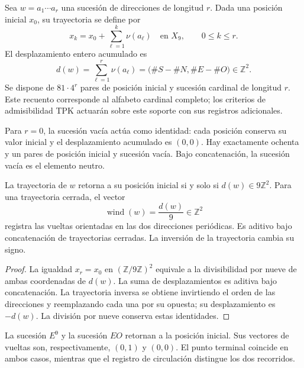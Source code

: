 Sea $w=a_1\cdots a_r$ una sucesión de direcciones de longitud $r$. Dada una posición inicial $x_0$, su trayectoria se define por
\[
 x_k=x_0+\sum_{\ell=1}^{k}\nu(a_\ell)\quad\text{en }X_9,
 \qquad 0\leq k\leq r.
\]
El desplazamiento entero acumulado es
\begin{equation}
 d(w)=\sum_{\ell=1}^{r}\nu(a_\ell)
      =\bigl(\#S-\#N,\#E-\#O\bigr)\in\mathbb Z^2.
 \label{eq:app-displacement}
\end{equation}
Se dispone de $81\cdot4^r$ pares de posición inicial y sucesión cardinal de longitud $r$. Este recuento corresponde al alfabeto cardinal completo; los criterios de admisibilidad TPK actuarán sobre este soporte con sus registros adicionales.

Para $r=0$, la sucesión vacía actúa como identidad: cada posición conserva su valor inicial y el desplazamiento acumulado es $(0,0)$. Hay exactamente ochenta y un pares de posición inicial y sucesión vacía. Bajo concatenación, la sucesión vacía es el elemento neutro.

\begin{bloqueindivisible}
\begin{teorema}
\label{thm:app-transporte}
La trayectoria de $w$ retorna a su posición inicial si y solo si $d(w)\in9\mathbb Z^2$. Para una trayectoria cerrada, el vector
\begin{equation}
 \operatorname{wind}(w)=\frac{d(w)}9\in\mathbb Z^2
\end{equation}
registra las vueltas orientadas en las dos direcciones periódicas. Es aditivo bajo concatenación de trayectorias cerradas. La inversión de la trayectoria cambia su signo.
\end{teorema}

\begin{proof}
La igualdad $x_r=x_0$ en $(\mathbb Z/9\mathbb Z)^2$ equivale a la divisibilidad por nueve de ambas coordenadas de $d(w)$. La suma de desplazamientos es aditiva bajo concatenación. La trayectoria inversa se obtiene invirtiendo el orden de las direcciones y reemplazando cada una por su opuesta; su desplazamiento es $-d(w)$. La división por nueve conserva estas identidades.
\end{proof}
\end{bloqueindivisible}

\begin{ejemplo}
La sucesión $E^9$ y la sucesión $EO$ retornan a la posición inicial. Sus vectores de vueltas son, respectivamente, $(0,1)$ y $(0,0)$. El punto terminal coincide en ambos casos, mientras que el registro de circulación distingue los dos recorridos.
\end{ejemplo}

